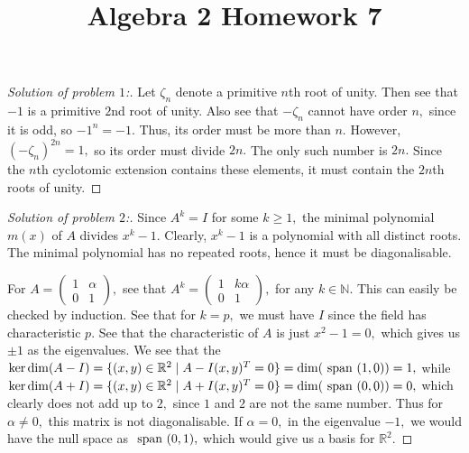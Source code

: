 \documentclass[letterpaper,11pt,twoside]{article}
\title{Algebra 2 Homework 7}
\theoremstyle{proposition}
\theoremstyle{definition}
\theoremstyle{theorem}
\theoremstyle{definition}
\theoremstyle{definition}
\theoremstyle{definition}
\theoremstyle{lemma}
\theoremstyle{definition}
\theoremstyle{definition}
\theoremstyle{corollary}
\theoremstyle{definition}
\theoremstyle{definition}
\theoremstyle{definition}
\renewcommand{\div}{\;\vert\;}
\begin{document}
	\maketitle
	\begin{proof}[Solution of problem $1$:]
		Let $\zeta_n$ denote a primitive $n$th root of unity. Then see that $-1$ is a primitive $2$nd root of unity. Also see that $-\zeta_n$ cannot have 
		order $n,$ since it is odd, so $-1^n=-1.$ Thus, its order must be more than $n.$ However, $(-\zeta_n)^{2n}=1,$ so its order must divide $2n.$ The 
		only such number is $2n.$ Since the $n$th cyclotomic extension contains these elements, it must contain the $2n$th roots of unity. 
	\end{proof}
\begin{proof}[Solution of problem $2$:]
	Since $A^k = I$ for some $k \geq 1,$ the minimal polynomial $m(x)$ of $A$ divides $x^k-1.$ Clearly, $x^k-1$ is a polynomial with all distinct roots. The 
	minimal polynomial has no repeated roots, hence it must be diagonalisable. 
	
	For $A= \begin{pmatrix}
		1 & \alpha \\
		0 & 1
	\end{pmatrix},$ see that $A^k=  \begin{pmatrix}
	1 & k\alpha \\
	0 & 1
\end{pmatrix},$ for any $k \in \mathbb{N}.$ This can easily be checked by induction. See that for $k=p,$ we must have $I$ since the field has characteristic 
$p.$ See that the characteristic of $A$ is just $x^2-1=0,$ which gives us $\pm 1$ as the eigenvalues. We see that the $\ker \dim (A-I)= \{ (x,y) \in 
\mathbb{R}^2 \div A-I(x,y)^T=0  \}= \dim(\text{ \textrm span } (1,0))=1,$ while $\ker \dim (A+I)= \{ (x,y) \in \mathbb{R}^2 \div A+I(x,y)^T=0  \}= 
\dim(\text{ \textrm span } (0,0) )=0, $ which clearly does not add up to $2,$ since $1$ and $2$ are not the same number. Thus for $\alpha \neq 0,$ this 
matrix is not diagonalisable. If $\alpha=0,$ in the eigenvalue $-1,$ we would have the null space as $ \text{ \textrm span } (0,1),$ which would give us a 
basis for $\mathbb{R}^2.$
\end{proof}
\end{document}
